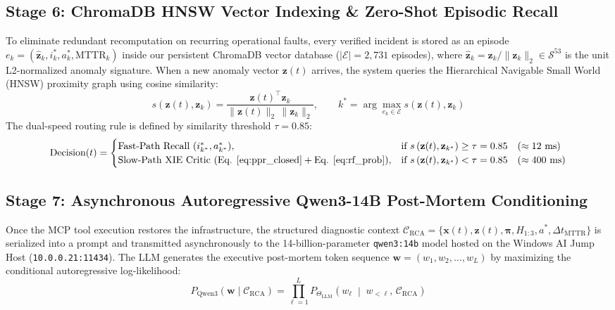 \subsection{Stage 6: ChromaDB HNSW Vector Indexing \& Zero-Shot Episodic Recall}
To eliminate redundant recomputation on recurring operational faults, every verified incident is stored as an episode $e_k = (\hat{\mathbf{z}}_k, i_k^*, a_k^*, \text{MTTR}_k)$ inside our persistent ChromaDB vector database ($|\mathcal{E}| = 2,731$ episodes), where $\hat{\mathbf{z}}_k = \mathbf{z}_k / \|\mathbf{z}_k\|_2 \in \mathcal{S}^{53}$ is the unit L2-normalized anomaly signature. When a new anomaly vector $\mathbf{z}(t)$ arrives, the system queries the Hierarchical Navigable Small World (HNSW) proximity graph using cosine similarity:
\begin{equation}
s\left( \mathbf{z}(t), \mathbf{z}_k \right) = \frac{\mathbf{z}(t)^\top \mathbf{z}_k}{\|\mathbf{z}(t)\|_2 \, \|\mathbf{z}_k\|_2}, \qquad k^* = \arg\max_{e_k \in \mathcal{E}} s\left( \mathbf{z}(t), \mathbf{z}_k \right)
\label{eq:chroma_cos}
\end{equation}
The dual-speed routing rule is defined by similarity threshold $\tau = 0.85$:
\begin{equation}
\text{Decision}(t) = \begin{cases}
\text{Fast-Path Recall } (i_{k^*}^*, a_{k^*}^*), & \text{if } s\left(\mathbf{z}(t), \mathbf{z}_{k^*}\right) \ge \tau = 0.85 \quad (\approx 12\text{ ms}) \\
\text{Slow-Path XIE Critic } (\text{Eq. } \ref{eq:ppr_closed} + \text{Eq. } \ref{eq:rf_prob}), & \text{if } s\left(\mathbf{z}(t), \mathbf{z}_{k^*}\right) < \tau = 0.85 \quad (\approx 400\text{ ms})
\end{cases}
\label{eq:chroma_gate}
\end{equation}

\subsection{Stage 7: Asynchronous Autoregressive Qwen3-14B Post-Mortem Conditioning}
Once the MCP tool execution restores the infrastructure, the structured diagnostic context $\mathcal{C}_{\text{RCA}} = \{ \mathbf{x}(t), \mathbf{z}(t), \boldsymbol{\pi}, H_{1:3}, a^*, \Delta t_{\text{MTTR}} \}$ is serialized into a prompt and transmitted asynchronously to the 14-billion-parameter \texttt{qwen3:14b} model hosted on the Windows AI Jump Host (\texttt{10.0.0.21:11434}). The LLM generates the executive post-mortem token sequence $\mathbf{w} = (w_1, w_2, \dots, w_L)$ by maximizing the conditional autoregressive log-likelihood:
\begin{equation}
P_{\text{Qwen3}}(\mathbf{w} \mid \mathcal{C}_{\text{RCA}}) = \prod_{\ell=1}^{L} P_{\Theta_{\text{LLM}}}\left( w_\ell \;\middle|\; w_{<\ell}, \, \mathcal{C}_{\text{RCA}} \right)
\label{eq:llm_autoreg}
\end{equation}

